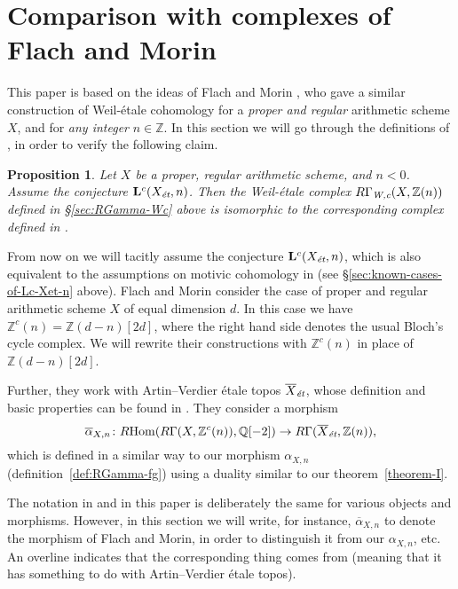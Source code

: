 \documentclass[leqno,12pt]{article}
\theoremstyle{plain}
\newtheorem{proposition}[theorem]{\indent\sc Proposition}
\theoremstyle{definition}
\DeclareMathOperator{\Hom}{Hom}
\newcommand{\QQ}{\mathbb{Q}}
\newcommand{\ZZ}{\mathbb{Z}}
\newcommand{\Wc}{\text{\it W,c}}
\newcommand{\et}{\text{\it \'{e}t}}
\newcommand{\RHom}{R\!\Hom}
\begin{document}

\section{Comparison with complexes of Flach and Morin}
\label{sec:comparison-with-FM}

This paper is based on the ideas of Flach and Morin \cite{Flach-Morin-2018}, who
gave a similar construction of Weil-étale cohomology for a
\emph{proper and regular} arithmetic scheme $X$, and for \emph{any integer}
$n \in \ZZ$. In this section we will go through the definitions of
\cite{Flach-Morin-2018}, in order to verify the following claim.

\begin{proposition}
  \label{prop:comparison-with-FM}
  Let $X$ be a proper, regular arithmetic scheme, and $n < 0$. Assume the
  conjecture $\mathbf{L}^c (X_\et, n)$. Then the Weil-\'{e}tale complex
  $R\Gamma_\Wc (X, \ZZ(n))$ defined in {\rm \S\ref{sec:RGamma-Wc}} above is isomorphic
  to the corresponding complex defined in {\rm \cite{Flach-Morin-2018}}.
\end{proposition}

From now on we will tacitly assume the conjecture $\mathbf{L}^c (X_\et, n)$,
which is also equivalent to the assumptions on motivic cohomology in
\cite{Flach-Morin-2018} (see \S\ref{sec:known-cases-of-Lc-Xet-n} above). Flach
and Morin consider the case of proper and regular arithmetic scheme $X$ of equal
dimension $d$. In this case we have $\ZZ^c (n) = \ZZ (d-n) [2d]$, where the
right hand side denotes the usual Bloch's cycle complex. We will rewrite their
constructions with $\ZZ^c (n)$ in place of $\ZZ (d-n) [2d]$.

Further, they work with Artin--Verdier \'{e}tale topos $\overline{X}_\et$, whose
definition and basic properties can be found in \cite[\S 6]{Flach-Morin-2018}.
They consider a morphism
\[ \overline{\alpha}_{X,n}\colon \RHom (R\Gamma (X, \ZZ^c (n)), \QQ [-2]) \to
  R\Gamma (\overline{X}_\et, \ZZ (n)), \]
which is defined in a similar way to our morphism $\alpha_{X,n}$
(definition~\ref{def:RGamma-fg}) using a duality similar to our
theorem~\ref{theorem-I}.

The notation in \cite{Flach-Morin-2018} and in this paper is deliberately the
same for various objects and morphisms. However, in this section we will write,
for instance, $\overline{\alpha}_{X,n}$ to denote the morphism of Flach and
Morin, in order to distinguish it from our $\alpha_{X,n}$, etc. An overline
indicates that the corresponding thing comes from \cite{Flach-Morin-2018}
(meaning that it has something to do with Artin--Verdier \'{e}tale topos).
\end{document}
